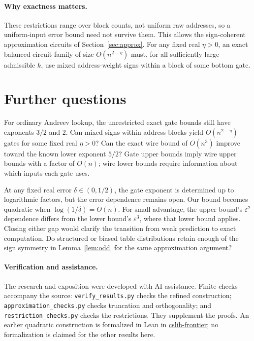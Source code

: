 \documentclass[11pt]{article}
\begin{document}
\paragraph{Why exactness matters.}
These restrictions range over block counts, not uniform raw addresses,
so a uniform-input error bound need not survive them. This allows the
sign-coherent approximation circuits of Section~\ref{sec:approx}.
For any fixed real $\eta>0$, an exact balanced circuit family of size
$O(n^{2-\eta})$ must, for all sufficiently large admissible $k$, use
mixed address-weight signs within a block of some bottom gate.

\section{Further questions}
For ordinary Andreev lookup, the unrestricted exact gate bounds still
have exponents $3/2$ and $2$. Can mixed signs within address blocks
yield $O(n^{2-\eta})$ gates for some fixed real $\eta>0$? Can the exact wire bound
of $O(n^3)$ improve toward the known lower exponent $5/2$? Gate upper
bounds imply wire upper bounds with a factor of $O(n)$; wire lower
bounds require information about which inputs each gate uses.

At any fixed real error $\delta\in(0,1/2)$, the gate exponent is determined up to
logarithmic factors, but the error dependence remains open. Our bound
becomes quadratic when $\log(1/\delta)=\Theta(n)$. For small advantage,
the upper bound's $\varepsilon^2$ dependence differs from the lower
bound's $\varepsilon^3$, where that lower bound applies. Closing either
gap would clarify the transition from weak prediction to exact computation.
Do structured or biased table distributions retain enough of the sign
symmetry in Lemma~\ref{lem:odd} for the same approximation argument?

\paragraph{Verification and assistance.}
The research and exposition were developed with AI assistance.
Finite checks accompany the source: \texttt{verify\_results.py} checks
the refined construction; \texttt{approximation\_checks.py} checks
truncation and orthogonality; and \texttt{restriction\_checks.py} checks
the restrictions. They supplement the proofs. An earlier quadratic
construction is formalized in Lean in
\href{https://github.com/cslib-community/cslib-frontier/pull/2813}{cslib-frontier};
no formalization is claimed for the other results here.
\end{document}
